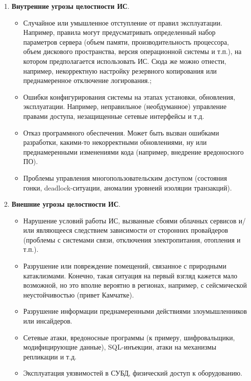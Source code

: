\begin{enumerate}
\item \textbf{Внутренние угрозы целостности ИС}.
    \begin{itemize}
        \item Случайное или умышленное отступление от правил эксплуатации. Например, правила могут предусматривать определенный набор параметров сервера (объем памяти, производительность процессора, объем дискового пространства, версия операционной системы и т.п.), на котором предполагается использовать ИС. Сюда же можно отнести, например, некорректную настройку резервного копирования или преднамеренное отключение логирования.;
        \item Ошибки конфигурирования системы на этапах установки, обновления, эксплуатации. Например, неправильное (необдуманное) управление правами доступа, незащищенные сетевые интерфейсы и т.д.
        \item Отказ программного обеспечения. Может быть вызван ошибками разработки, какими-то некорректными обновлениями, ну или преднамеренными изменениями кода (например, внедрение вредоносного ПО).
	    \item Проблемы управления многопользовательским доступом (состояния гонки, deadlock-ситуации, аномалии уровнеий изоляции транзакций).
    \end{itemize}

\item \textbf{Внешние угрозы целостности ИС}.
    \begin{itemize}
        \item Нарушение условий работы ИС, вызванные сбоями облачных сервисов и/или являющееся следствием зависимости от сторонних провайдеров (проблемы с системами связи, отключения электропитания, отопления и т.п.).
        \item Разрушение или повреждение помещений, связанное с природными катаклизмами. Конечно, такая ситуация на первый взгляд кажется мало возможной, но это вполне вероятно в регионах, например, с сейсмической неустойчивостью (привет Камчатке).
        \item Разрушение информации преднамеренными действиями злоумышленников или инсайдеров.
        \item Сетевые атаки, вредоносные программы (к примеру, шифровальщики, модифицирующие данные), SQL-инъекции, атаки на механизмы репликации и т.д.
	\item Эксплуатация уязвимостей в СУБД, физический доступ к оборудованию.
    \end{itemize}
\end{enumerate}

